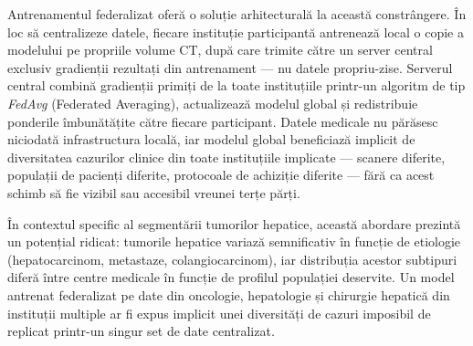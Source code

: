 \documentclass[12pt, a4paper]{report}
\begin{document}
      Antrenamentul federalizat oferă o soluție arhitecturală la această
      constrângere. În loc să centralizeze datele, fiecare instituție participantă
      antrenează local o copie a modelului pe propriile volume CT, după care
      trimite către un server central exclusiv gradienții rezultați din
      antrenament — nu datele propriu-zise. Serverul central combină gradienții
      primiți de la toate instituțiile printr-un algoritm de tip
      \textit{FedAvg} (Federated Averaging), actualizează modelul global și
      redistribuie ponderile îmbunătățite către fiecare participant. Datele
      medicale nu părăsesc niciodată infrastructura locală, iar modelul global
      beneficiază implicit de diversitatea cazurilor clinice din toate
      instituțiile implicate — scanere diferite, populații de pacienți diferite,
      protocoale de achiziție diferite — fără ca acest schimb să fie vizibil
      sau accesibil vreunei terțe părți.

      În contextul specific al segmentării tumorilor hepatice, această abordare
      prezintă un potențial ridicat: tumorile hepatice variază semnificativ în
      funcție de etiologie (hepatocarcinom, metastaze, colangiocarcinom),
      iar distribuția acestor subtipuri diferă între centre medicale în funcție
      de profilul populației deservite. Un model antrenat federalizat pe date
      din oncologie, hepatologie și chirurgie hepatică din instituții multiple
      ar fi expus implicit unei diversități de cazuri imposibil de replicat
      printr-un singur set de date centralizat.
\end{document}
